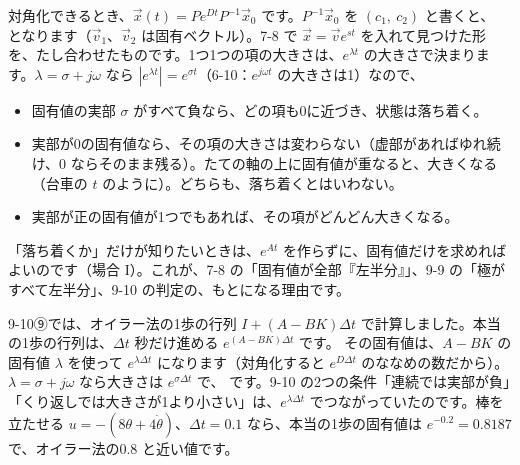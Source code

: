 \label{bk:9-11:antei}対角化できるとき、$\vec x(t)=Pe^{Dt}P^{-1}\vec x_0$ です。$P^{-1}\vec x_0$ を $(c_1,\ c_2)$ と書くと、
となります（$\vec v_1$、$\vec v_2$ は固有ベクトル）。7-8 で $\vec x=\vec ve^{st}$ を入れて見つけた形を、たし合わせたものです。1つ1つの項の大きさは、$e^{\lambda t}$ の大きさで決まります。$\lambda=\sigma+j\omega$ なら $|e^{\lambda t}|=e^{\sigma t}$（6-10：$e^{j\omega t}$ の大きさは1）なので、
\begin{itemize}[leftmargin=1.2\zw, itemsep=2pt, topsep=2pt, label={\color{\bkTT}●}]
\item 固有値の実部 $\sigma$ がすべて負なら、どの項も0に近づき、状態は落ち着く。
\item 実部が0の固有値なら、その項の大きさは変わらない（虚部があればゆれ続け、0 ならそのまま残る）。たての軸の上に固有値が重なると、大きくなる（台車の $t$ のように）。どちらも、落ち着くとはいわない。
\item 実部が正の固有値が1つでもあれば、その項がどんどん大きくなる。
\end{itemize}
「落ち着くか」だけが知りたいときは、$e^{At}$ を作らずに、固有値だけを求めればよいのです（場合 I）。これが、7-8 の「固有値が全部『左半分』」、9-9 の「極がすべて左半分」、9-10 の判定の、もとになる理由です。

9-10⑨では、オイラー法の1歩の行列 $I+(A-BK)\Delta t$ で計算しました。本当の1歩の行列は、$\Delta t$ 秒だけ進める $e^{(A-BK)\Delta t}$ です。
その固有値は、$A-BK$ の固有値 $\lambda$ を使って $e^{\lambda\Delta t}$ になります（対角化すると $e^{D\Delta t}$ のななめの数だから）。$\lambda=\sigma+j\omega$ なら大きさは $e^{\sigma\Delta t}$ で、
です。9-10 の2つの条件「連続では実部が負」「くり返しでは大きさが1より小さい」は、$e^{\lambda\Delta t}$ でつながっていたのです。棒を立たせる $u=-(8\theta+4\dot\theta)$、$\Delta t=0.1$ なら、本当の1歩の固有値は $e^{-0.2}=0.8187$ で、オイラー法の0.8 と近い値です。


